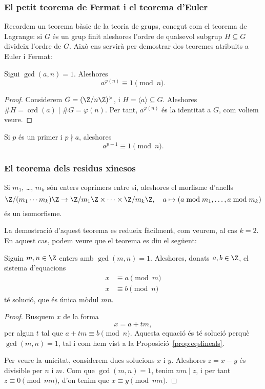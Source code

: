  \subsubsection{El petit teorema de Fermat i el teorema d'Euler}
 Recordem un teorema bàsic de la teoria de grups, conegut com el teorema de Lagrange: si $G$ és un grup finit aleshores l'ordre de qualsevol subgrup $H\subseteq G$ divideix l'ordre de $G$. Això ens servirà per demostrar dos teoremes atribuits a Euler i Fermat:
 \begin{theorem}[Euler]
 \label{thm:Euler}
 Sigui $\gcd(a,n)=1$. Aleshores
 \[
 a^{\varphi(n)}\equiv 1\pmod{n}.
 \]
 \end{theorem}
 \begin{proof}
  Considerem $G=(\Z/n\Z)^\times$, i $H=\langle a\rangle\subseteq G$. Aleshores $\#H = \operatorname{ord}(a) \mid \#G = \varphi(n)$. Per tant, $a^{\varphi(n)}$ és la identitat a $G$, com voliem veure.
 \end{proof}
 
 \begin{corollary}
 Si $p$ és un primer i $p\nmid a$, aleshores
 \[
 a^{p-1} \equiv 1\pmod{n}.
 \]
 \end{corollary}
 
  \subsubsection{El teorema dels residus xinesos}
  
  \begin{theorem}
  \label{thm:crt}
  Si $m_1$, \ldots, $m_k$ són enters coprimers entre si, aleshores el morfisme d'anells
  \[
  \Z/(m_1\cdots m_k)\Z\to\Z/m_1\Z \times\cdots\times \Z/m_k\Z,\quad a\mapsto (a\bmod m_1,\ldots, a\bmod m_k)
  \]
  és un isomorfisme.
  \end{theorem}
  
  La demostració d'aquest teorema es redueix fàcilment, com veurem, al cas $k=2$. En aquest cas, podem veure que el teorema es diu el següent:
  \begin{proposition}
   Siguin $m,n\in\Z$ enters amb $\gcd(m,n)=1$. Aleshores, donats $a,b\in \Z$, el sistema d'equacions
   \begin{align*}
   x&\equiv a\pmod{m}\\
   x&\equiv b\pmod{n}
   \end{align*}
   té solució, que és única mòdul $mn$.
  \end{proposition}
  \begin{proof}
  Busquem $x$ de la forma
  \[
  x = a+tm,
  \]
  per algun $t$ tal que $a+tm\equiv b\pmod{n}$. Aquesta equació és té solució perquè $\gcd(m,n)=1$, tal i com hem vist a la Proposició~\ref{prop:eqslineals}.
  
  Per veure la unicitat, considerem dues solucions $x$ i $y$. Aleshores $z=x-y$ és divisible per $n$ i $m$. Com que $\gcd(m,n)=1$, tenim $nm\mid z$, i per tant $z\equiv 0\pmod{mn}$, d'on tenim que $x\equiv y\pmod{mn}$.
  \end{proof}

